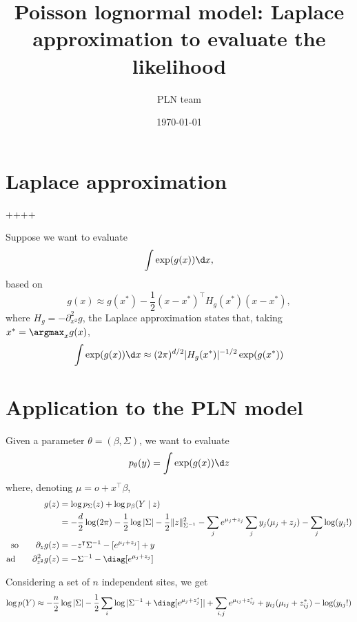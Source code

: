 \documentclass{article}
\title{Poisson lognormal model: Laplace approximation to evaluate the likelihood}
\author{PLN team}
\date{\today}
\begin{document}
\maketitle

\section{Laplace approximation} ++++

Suppose we want to evaluate
$$
\int \exp(g(x)) \d x, 
$$
based on 
$$
g(x) \approx g(x^*) - \frac12 (x - x^*)^\intercal H_g(x^*) (x - x^*),
$$
where $H_g = -\partial^2_{x^2} g$, the Laplace approximation states that, taking $x^* = \argmax_x g(x)$, 
$$
\int \exp(g(x)) \d x \approx (2\pi)^{d/2} |H_g(x^*)|^{-1/2} \exp(g(x^*))
$$

\section{Application to the PLN model}

Given a parameter $\theta = (\beta, \Sigma)$, we want to evaluate
$$
p_\theta(y) = \int \exp(g(x)) \d z
$$
where, denoting $\mu = o + x^\intercal \beta$,
\begin{align*}
 g(z) 
 & = \log p_\Sigma(z) + \log p_\beta(Y \mid z) \\
 & = - \frac{d}2 \log(2\pi) - \frac12 \log|\Sigma| - \frac12 \|z\|^2_{\Sigma^{-1}} - \sum_j e^{\mu_j + z_j} \sum_j y_j(\mu_j + z_j) - \sum_j \log(y_j !) \\
 \text{so} \qquad \partial_z g(z)
 & = - z^\intercal \Sigma^{-1} - [e^{\mu_j + z_j}] + y \\
 \text{ad} \qquad \partial^2_{z^2} g(z)
 & = - \Sigma^{-1} - \diag[e^{\mu_j + z_j}]
\end{align*}

Considering a set of $n$ independent sites, we get
$$
\log p(Y) \approx - \frac{n}2 \log |\Sigma| - \frac12 \sum_i \log|\Sigma^{-1} + \diag[e^{\mu_j + z^*_j}]| + \sum_{i, j} e^{\mu_{ij} + z^*_{ij}} + y_{ij}(\mu_{ij} + z^*_{ij}) - \log(y_{ij}!)
$$
\end{document}
